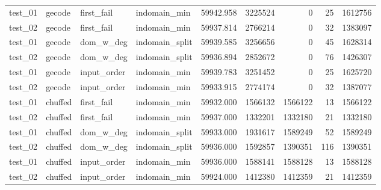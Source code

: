 \begin{longtable}{l l l l r r r r r}
    test\_01         & gecode          & first\_fail       & indomain\_min     & 59942.958          & 3225524        & 0                 & 25             & 1612756            \\
    test\_02         & gecode          & first\_fail       & indomain\_min     & 59937.814          & 2766214        & 0                 & 32             & 1383097            \\
    \midrule
    test\_01         & gecode          & dom\_w\_deg       & indomain\_split   & 59939.585          & 3256656        & 0                 & 45             & 1628314            \\
    test\_02         & gecode          & dom\_w\_deg       & indomain\_split   & 59936.894          & 2852672        & 0                 & 76             & 1426307            \\
    \midrule
    test\_01         & gecode          & input\_order      & indomain\_min     & 59939.783          & 3251452        & 0                 & 25             & 1625720            \\
    test\_02         & gecode          & input\_order      & indomain\_min     & 59933.915          & 2774174        & 0                 & 32             & 1387077            \\
    \midrule
    test\_01         & chuffed         & first\_fail       & indomain\_min     & 59932.000          & 1566132        & 1566122           & 13             & 1566122            \\
    test\_02         & chuffed         & first\_fail       & indomain\_min     & 59937.000          & 1332201        & 1332180           & 21             & 1332180            \\
    \midrule
    test\_01         & chuffed         & dom\_w\_deg       & indomain\_split   & 59933.000          & 1931617        & 1589249           & 52             & 1589249            \\
    test\_02         & chuffed         & dom\_w\_deg       & indomain\_split   & 59936.000          & 1592857        & 1390351           & 116            & 1390351            \\
    \midrule
    test\_01         & chuffed         & input\_order      & indomain\_min     & 59936.000          & 1588141        & 1588128           & 13             & 1588128            \\
    test\_02         & chuffed         & input\_order      & indomain\_min     & 59924.000          & 1412380        & 1412359           & 21             & 1412359            \\
\end{longtable}